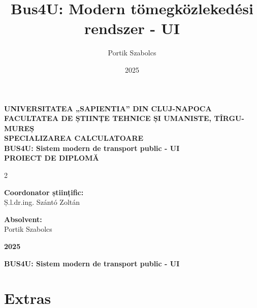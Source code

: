\documentclass[12pt, a4paper, oneside]{report}             %
\title{Bus4U: Modern tömegközlekedési rendszer - UI}
\author{Portik Szabolcs}
\date{2025}
\begin{document}

\begin{titlepage}
  \center
  \fontsize{18}{22}\selectfont
  \textbf{UNIVERSITATEA „SAPIENTIA” DIN CLUJ-NAPOCA} \\
  \fontsize{16}{20}\selectfont
  \textbf{FACULTATEA DE ȘTIINȚE TEHNICE ȘI UMANISTE, TÎRGU-MUREȘ} \\
  \textbf{SPECIALIZAREA CALCULATOARE} \\
  \vspace{1.5in}
  \Huge
  \textbf{BUS4U: Sistem modern de transport public - UI} \\
  \vspace{0.2in}
  \LARGE
  \textbf{PROIECT DE DIPLOMĂ} \\
  \vspace{1.5in}
  \Large
  \begin{multicols}{2}
    \begin{flushleft}
      \textbf{Coordonator științific:} \\
      Ș.l.dr.ing. Szántó Zoltán
    \end{flushleft}
    \columnbreak
    \begin{flushright}
      \textbf{Absolvent:} \\
      Portik Szabolcs
    \end{flushright}
  \end{multicols}
  \vspace{1in}
  \Huge
  \textbf{2025}
\end{titlepage}



\begin{center}
  \LARGE
  \textbf{BUS4U: Sistem modern de transport public - UI} \\
\end{center}
\section*{Extras}

\end{document}
